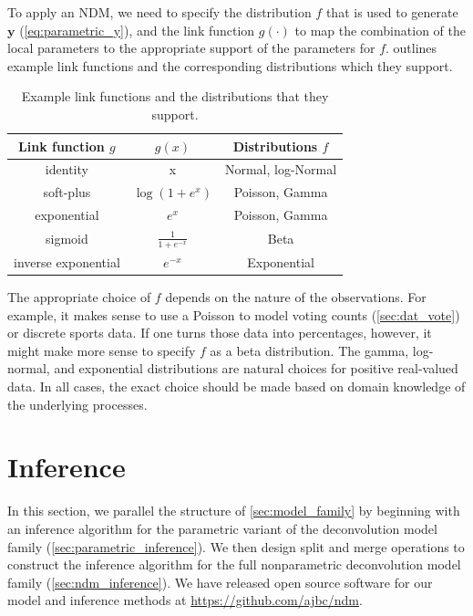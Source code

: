 \documentclass[twoside,11pt]{article}
\begin{document}
To apply an NDM, we need to specify the distribution $f$ that is used to generate $\boldsymbol{y}$ (\cref{eq:parametric_y}), and the link function $g(\cdot)$ to map the combination of the local parameters to the appropriate support of the parameters for $f$.  outlines example link functions and the corresponding distributions which they support.  

\begin{table}[ht]
\small
\centering
\begin{tabular}{ccc}
\toprule
\textbf{Link function $g$} &  \textbf{$g(x)$} & \textbf{Distributions $f$} \\
\midrule
identity & x & Normal, log-Normal \\
soft-plus & $\log(1+e^x)$ & Poisson, Gamma\\
exponential & $e^x$ & Poisson, Gamma \\
sigmoid & $\frac{1}{1 + e^{-x}}$ & Beta \\
inverse exponential & $e^{-x}$ & Exponential \\
\bottomrule
\end{tabular}
\caption{Example link functions and the distributions that they support.}
\label{tab:link_functions}
\end{table}

The appropriate choice of $f$ depends on the nature of the observations.  For example, it makes sense to use a Poisson to model voting counts (\cref{sec:dat_vote}) or discrete sports data.  If one turns those data into percentages, however, it might make more sense to specify $f$ as a beta distribution.  The gamma, log-normal, and exponential distributions are natural choices for positive real-valued data.  In all cases, the exact choice should be made based on domain knowledge of the underlying processes.



\section{Inference}
\label{sec:inference}
In this section, we parallel the structure of \cref{sec:model_family} by beginning with an inference algorithm for the parametric variant of the deconvolution model family (\cref{sec:parametric_inference}).  We then design split and merge operations to construct the inference algorithm for the full nonparametric deconvolution model family (\cref{sec:ndm_inference}).  We have released open source software for our model and inference methods at \url{https://github.com/ajbc/ndm}.
\end{document}
